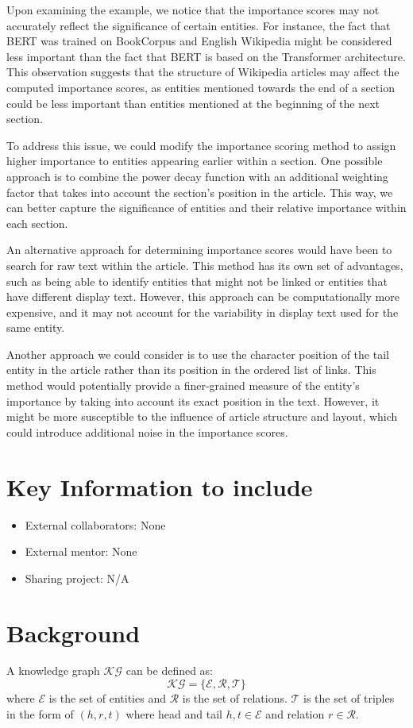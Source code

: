 \documentclass{article}
\begin{document}
Upon examining the example, we notice that the importance scores may not accurately reflect the significance of certain entities. For instance, the fact that BERT was trained on BookCorpus and English Wikipedia might be considered less important than the fact that BERT is based on the Transformer architecture. This observation suggests that the structure of Wikipedia articles may affect the computed importance scores, as entities mentioned towards the end of a section could be less important than entities mentioned at the beginning of the next section.

To address this issue, we could modify the importance scoring method to assign higher importance to entities appearing earlier within a section. One possible approach is to combine the power decay function with an additional weighting factor that takes into account the section's position in the article. This way, we can better capture the significance of entities and their relative importance within each section.

An alternative approach for determining importance scores would have been to search for raw text within the article. This method has its own set of advantages, such as being able to identify entities that might not be linked or entities that have different display text. However, this approach can be computationally more expensive, and it may not account for the variability in display text used for the same entity.

Another approach we could consider is to use the character position of the tail entity in the article rather than its position in the ordered list of links. This method would potentially provide a finer-grained measure of the entity's importance by taking into account its exact position in the text. However, it might be more susceptible to the influence of article structure and layout, which could introduce additional noise in the importance scores.


\section{Key Information to include}
\begin{itemize}
\item External collaborators: None
\item External mentor: None
\item Sharing project: N/A
\end{itemize}

\section{Background}
A knowledge graph $\mathcal{KG}$ can be defined as:
\begin{equation}
  \mathcal{KG} = \{\mathcal{E}, \mathcal{R}, \mathcal{T}\}
\end{equation}
where $\mathcal{E}$ is the set of entities and $\mathcal{R}$ is the set of relations. $\mathcal{T}$ is the set of triples in the form of $(h,r,t)$ where head and tail $h,t \in \mathcal{E}$ and relation $r \in \mathcal{R}$.
\end{document}
